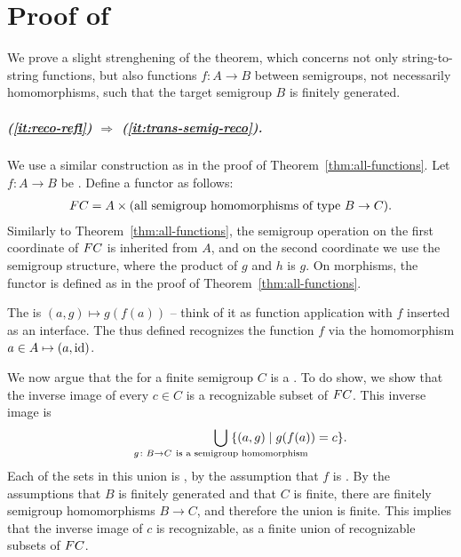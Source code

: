 \section{Proof of~}
    We prove a slight strenghening of the theorem, which concerns not only string-to-string functions, but also functions $f\colon A \to B$ between semigroups, not necessarily homomorphisms, such that the target semigroup $B$ is finitely generated.

    \subparagraph{(\ref{it:reco-refl}) $\Rightarrow$ (\ref{it:trans-semig-reco}).}  We  use a similar construction as in the proof of Theorem~\ref{thm:all-functions}. Let  $f\colon A \to B$  be .  Define  a functor as follows: 
    \begin{align*}
        \functor C = A \times \text{(all semigroup homomorphisms of type $B \to C$)}.
    \end{align*}
    Similarly to Theorem~\ref{thm:all-functions}, the semigroup operation on the first coordinate of $\functor C$ is inherited from $A$, and on the second coordinate we use the  semigroup structure,  where the product of $g$ and $h$ is $g$.     On morphisms, the functor is defined as in the proof of Theorem~\ref{thm:all-functions}. 

    The   is $(a,g) \mapsto g(f(a))$ -- think of it as function application with $f$ inserted as an interface. The  thus defined recognizes the function $f$ via the homomorphism $a \in A  \mapsto  (a,\mathrm{id})$.
    
    We now argue that the  for a finite semigroup $C$ is a .
     To do show, we show that the inverse image of every $c \in C$ is a  recognizable subset of $\functor C$. This inverse image is
    \begin{align*}
    \qquad\qquad\qquad\qquad \bigcup_{\mathclap{g\colon B \to C\ \text{is a semigroup homomorphism}}} \; \{(a,g) \mid g(f(a))=c \}.
    \end{align*}
    Each of the sets in this union is , by the assumption that $f$ is .     By the assumptions that $B$ is finitely generated and that $C$ is finite, there are finitely semigroup homomorphisms $B \to C$, and therefore the union is finite. This implies that the inverse image of $c$ is recognizable, as a finite union of recognizable subsets of  $\functor C$.
    
